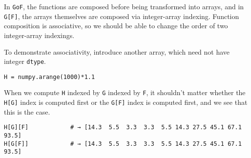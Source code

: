 \documentclass[12pt]{article}
\begin{document}
In \texttt{GoF}, the functions are composed before being transformed into arrays, and in \texttt{G[F]}, the arrays themselves are composed via integer-array indexing. Function composition is associative, so we should be able to change the order of two integer-array indexings.

To demonstrate associativity, introduce another array, which need not have integer \texttt{dtype}.
\begin{verbatim}
H = numpy.arange(1000)*1.1
\end{verbatim}
\noindent When we compute \texttt{H} indexed by \texttt{G} indexed by \texttt{F}, it shouldn't matter whether the \texttt{H[G]} index is computed first or the \texttt{G[F]} index is computed first, and we see that this is the case.
\begin{verbatim}
H[G][F]            # → [14.3  5.5  3.3  3.3  5.5 14.3 27.5 45.1 67.1 93.5]
H[G[F]]            # → [14.3  5.5  3.3  3.3  5.5 14.3 27.5 45.1 67.1 93.5]
\end{verbatim}
\end{document}
